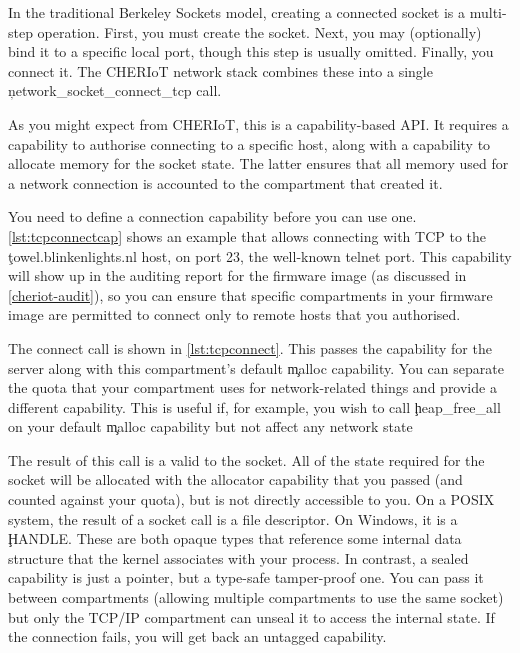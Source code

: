 In the traditional Berkeley Sockets model, creating a connected socket is a multi-step operation.
First, you must create the socket.
Next, you may (optionally) bind it to a specific local port, though this step is usually omitted.
Finally, you connect it.
The CHERIoT network stack combines these into a single \c{network_socket_connect_tcp} call.


As you might expect from CHERIoT, this is a capability-based API.
It requires a capability to authorise connecting to a specific host, along with a capability to allocate memory for the socket state.
The latter ensures that all memory used for a network connection is accounted to the compartment that created it.

You need to define a connection capability before you can use one.
\ref{lst:tcpconnectcap} shows an example that allows connecting with TCP to the \c{towel.blinkenlights.nl} host, on port 23, the well-known telnet port.
This capability will show up in the auditing report for the firmware image (as discussed in \ref{cheriot-audit}), so you can ensure that specific compartments in your firmware image are permitted to connect only to remote hosts that you authorised.

\codelisting[filename=examples/tcp/tcp.cc,marker=server_capability,label=lst:tcpconnectcap,caption="A static capability that authorises connecting to a remote server."]{}

The connect call is shown in \ref{lst:tcpconnect}.
This passes the capability for the server along with this compartment's default \c{malloc} capability.
You can separate the quota that your compartment uses for network-related things and provide a different capability.
This is useful if, for example, you wish to call \c{heap_free_all} on your default \c{malloc} capability but not affect any network state

\codelisting[filename=examples/tcp/tcp.cc,marker=connect,label=lst:tcpconnect,caption="Connecting to a remote server."]{}

The result of this call is a valid  to the socket.
All of the state required for the socket will be allocated with the allocator capability that you passed (and counted against your quota), but is not directly accessible to you.
On a POSIX system, the result of a socket call is a file descriptor.
On Windows, it is a \c{HANDLE}.
These are both opaque types that reference some internal data structure that the kernel associates with your process.
In contrast, a sealed capability is just a pointer, but a type-safe tamper-proof one.
You can pass it between compartments (allowing multiple compartments to use the same socket) but only the TCP/IP compartment can unseal it to access the internal state.
If the connection fails, you will get back an untagged capability.

